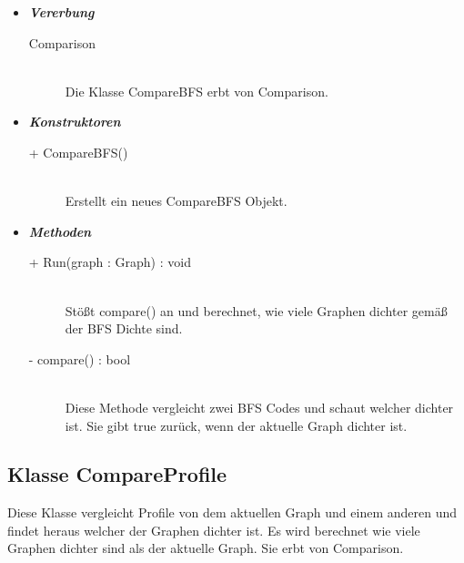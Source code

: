 \documentclass[13pt]{scrreprt}
\begin{document}
\begin{itemize} [label = {$\circ$}]
	\item {\large \textbf{\textit{Vererbung}}\par}
	\begin{description}
		\item[Comparison] \hfill \\Die Klasse CompareBFS erbt von Comparison.
	\end{description}
	\item {\large \textbf{\textit{Konstruktoren}}\par}
	\begin{description}
		\item[+ CompareBFS()] \hfill \\Erstellt ein neues CompareBFS Objekt.
	\end{description}
	\item {\large \textbf{\textit{Methoden}}\par}
	\begin{description}
		\item[+ Run(graph : Graph) : void] \hfill \\Stößt compare() an und berechnet, wie viele Graphen dichter gemäß der BFS Dichte sind.
		\item[- compare() : bool] \hfill \\Diese Methode vergleicht zwei BFS Codes und schaut welcher dichter ist. Sie gibt true zurück, wenn der aktuelle Graph dichter ist.
	\end{description}
\end{itemize}

\subsection{Klasse CompareProfile}

Diese Klasse vergleicht Profile von dem aktuellen Graph und einem anderen und findet heraus welcher der Graphen dichter ist. Es wird berechnet wie viele Graphen dichter sind als der aktuelle Graph. Sie erbt von Comparison.
\end{document}
